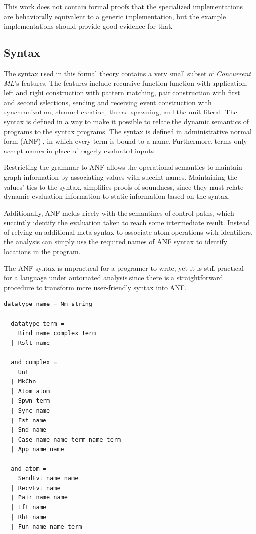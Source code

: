 \documentclass[letterpaper, 11pt]{extarticle}
\begin{document}
This work does not contain formal proofs that the specialized implementations are
behaviorally equivalent to a generic implementation, but the example implementations
should provide good evidence for that.

\subsection{Syntax}
The syntax used in this formal theory contains a very small subset of
\textit{Concurrent ML}'s features. The features include recursive function function with
application, left and right construction with pattern matching, pair construction with first
and second selections, sending and receiving event construction with synchronization,
channel creation, thread spawning, and the unit literal. The syntax is defined in a way to
make it possible to relate the dynamic semantics of programs to the syntax programs.
The syntax is defined in administrative normal form (ANF) \cite{flanagan1993essence}, in which every term
is bound to a name. Furthermore, terms only accept names in place of eagerly evaluated
inputs. 

Restricting the grammar to ANF allows the operational semantics
to maintain graph information by associating values with succint names.
Maintaining the values' ties to the syntax,
simplifies proofs of soundness, since they must relate dynamic evaluation information
to static information based on the syntax.

Additionally, ANF melds nicely with the semantincs of control paths, which succintly identify
the evaluation taken to reach some intermediate result.
Instead of relying on additional meta-syntax to associate atom operations with identifiers,
the analysis can simply use the required names of ANF syntax to identify locations in the program.

The ANF syntax is impractical for a programer to write,
yet it is still practical for a language under automated analysis
since there is a straightforward procedure to transform
more user-friendly syntax into ANF.

\begin{lstlisting}[language=logic]
  datatype name = Nm string

  datatype term = 
    Bind name complex term 
  | Rslt name

  and complex = 
    Unt
  | MkChn
  | Atom atom
  | Spwn term 
  | Sync name
  | Fst name
  | Snd name
  | Case name name term name term 
  | App name name

  and atom = 
    SendEvt name name
  | RecvEvt name
  | Pair name name
  | Lft name
  | Rht name
  | Fun name name term 
\end{lstlisting}
\end{document}
